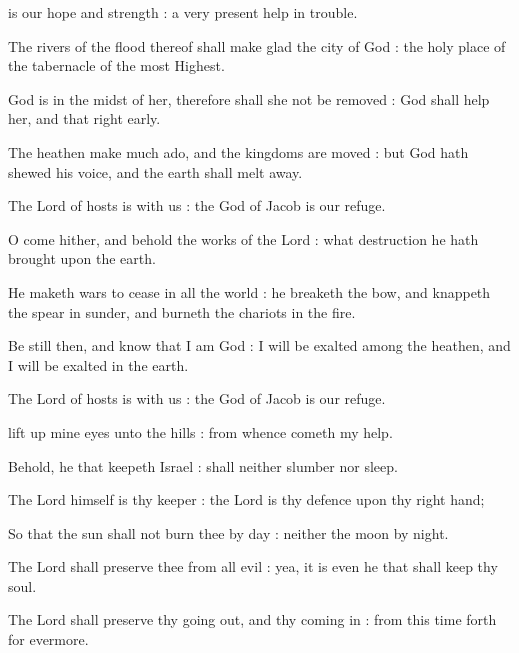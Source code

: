  is our hope and strength : a very present help in trouble.\par
{}
The rivers of the flood thereof shall make glad the city of God : the holy place of the tabernacle of the most Highest.\par
{}God is in the midst of her, therefore shall she not be removed : God shall help her, and that right early.\par
{}The heathen make much ado, and the kingdoms are moved : but God hath shewed his voice, and the earth shall melt away.\par
{}The Lord of hosts is with us : the God of Jacob is our refuge.\par
{}O come hither, and behold the works of the Lord : what destruction he hath brought upon the earth.\par
{}He maketh wars to cease in all the world : he breaketh the bow, and knappeth the spear in sunder, and burneth the chariots in the fire.\par
{}Be still then, and know that I am God : I will be exalted among the heathen, and I will be exalted in the earth.\par
{}The Lord of hosts is with us : the God of Jacob is our refuge.\par

 lift up mine eyes unto the hills : from whence cometh my help.\par
{}
Behold, he that keepeth Israel : shall neither slumber nor sleep.\par
{}The Lord himself is thy keeper : the Lord is thy defence upon thy right hand;\par
{}So that the sun shall not burn thee by day : neither the moon by night.\par
{}The Lord shall preserve thee from all evil : yea, it is even he that shall keep thy soul.\par
{}The Lord shall preserve thy going out, and thy coming in : from this time forth for evermore.\par

